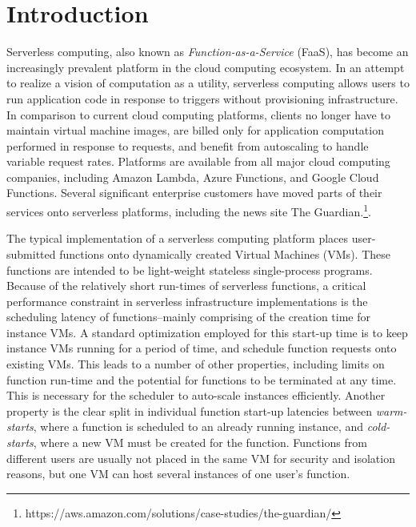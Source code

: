 \section{Introduction} \label{sec:intro}

 Serverless computing, also known as
\emph{Function-as-a-Service} (FaaS), has become an increasingly prevalent
platform in the cloud computing ecosystem. In an attempt to realize a vision of
computation as a utility, serverless computing allows users to run application
code in response to triggers without provisioning infrastructure. In comparison
to current cloud computing platforms, clients no longer have to maintain
virtual machine images, are billed only for application computation performed
in response to requests, and benefit from autoscaling to handle variable
request rates. Platforms are available from all major cloud computing
companies, including Amazon Lambda, Azure Functions, and Google Cloud
Functions. Several significant enterprise customers have moved parts of their
services onto serverless platforms, including the news site The
Guardian.\footnote{https://aws.amazon.com/solutions/case-studies/the-guardian/}.

 The typical implementation of a
serverless computing platform places user-submitted functions onto dynamically
created Virtual Machines (VMs). These functions are intended to be light-weight
stateless single-process programs. Because of the relatively short run-times of
serverless functions, a critical performance constraint in serverless
infrastructure implementations is the scheduling latency of functions--mainly
comprising of the creation time for instance VMs. A standard optimization
employed for this start-up time is to keep instance VMs running for a period of
time, and schedule function requests onto existing VMs. This leads to a number
of other properties, including limits on function run-time and the potential
for functions to be terminated at any time. This is necessary for the scheduler
to auto-scale instances efficiently. Another property is the clear split in
individual function start-up latencies between \emph{warm-starts}, where a function
is scheduled to an already running instance, and \emph{cold-starts}, where a new VM
must be created for the function. Functions from different users are usually
not placed in the same VM for security and isolation reasons, but one VM can
host several instances of one user's function.

